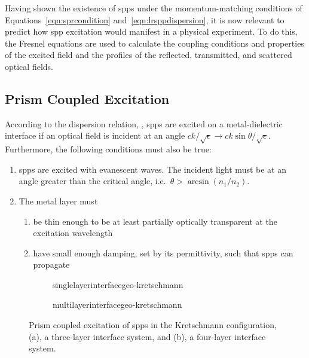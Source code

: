 Having shown the existence of \glspl{spp} under the momentum-matching conditions
of Equations~\ref{eqn:sprcondition} and~\ref{eqn:lrsppdispersion}, it is
now relevant to predict how \gls{spp} excitation would manifest in a physical
experiment.  To do this, the Fresnel equations are used to calculate the
coupling conditions and properties of the excited field and the profiles of
the reflected, transmitted, and scattered optical fields.

\subsection{Prism Coupled Excitation}
According to the dispersion relation, , \glspl{spp} are
excited on a metal-dielectric interface if an optical field is incident at
an angle $ck/\sqrt{\epsilon} \to ck\sin\theta/\sqrt{\epsilon}$.
Furthermore, the following conditions must also be true:
\begin{enumerate}
  \item \glspl{spp} are excited with evanescent waves.  The
        incident light must be at an angle greater than the critical angle, i.e.\
        $\theta>\arcsin\left(n_1/n_2\right)$.
  \item The metal layer must
        \begin{enumerate}
          \item be thin enough to be at least partially optically transparent at the excitation wavelength
          \item have small enough damping, set by its permittivity, such that \glspl{spp} can propagate
        \end{enumerate}
\end{enumerate}

\begin{figure}[ht]
  \centering
  \begin{subfigure}[b]{0.4\textwidth}
    \centering
    {singlelayerinterfacegeo-kretschmann}
    \caption{}
  \end{subfigure}
  \begin{subfigure}[b]{0.4\textwidth}
    {multilayerinterfacegeo-kretschmann}
    \caption{}
  \end{subfigure}
  \caption{Prism coupled excitation of \glspl{spp} in the Kretschmann configuration,
    (a), a three-layer interface system, and (b), a four-layer interface system. }
  \label{fig:prismcoupledsetups}
\end{figure}

